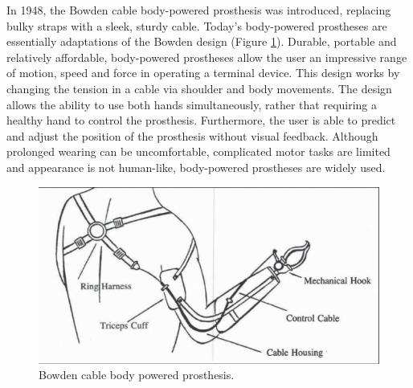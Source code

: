 \documentclass[11pt, a4paper]{article}
\begin{document}
\noindent
In 1948, the Bowden cable body-powered prosthesis was introduced, replacing bulky straps with a sleek, sturdy cable.
Today's body-powered prostheses are essentially adaptations of the Bowden design (Figure \ref{fig:BowdenProsthesis}). 
Durable, portable and relatively affordable, body-powered prostheses allow the user an impressive range of motion, speed and force in operating a terminal device.
This design works by changing the tension in a cable via shoulder and body movements.
The design allows the ability to use both hands simultaneously, rather that requiring a healthy hand to control the prosthesis.
Furthermore, the user is able to predict and adjust the position of the prosthesis without visual feedback.
Although prolonged wearing can be uncomfortable, complicated motor tasks are limited and appearance is not human-like, body-powered prostheses are widely used.
\\
\begin{figure}[h]
    \centering
    \includegraphics[scale=0.4]{BowdenProsthesis.jpg}
    \caption{Bowden cable body powered prosthesis.}
    \label{fig:BowdenProsthesis}
\end{figure} 
\end{document}
